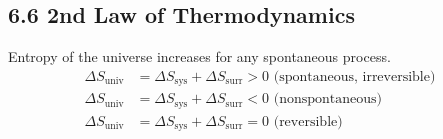 \subsection{6.6 2nd Law of Thermodynamics}
    \vspace*{0.2em}
    Entropy of the universe increases for any spontaneous process.
    \begin{align*}
        \Delta S_\text{univ} & = \Delta S_\text{sys} + \Delta S_\text{surr} > 0 \text{ (spontaneous, irreversible)}\\
        \Delta S_\text{univ} & = \Delta S_\text{sys} + \Delta S_\text{surr} < 0 \text{ (nonspontaneous)}\\
        \Delta S_\text{univ} & = \Delta S_\text{sys} + \Delta S_\text{surr} = 0 \text{ (reversible)}
    \end{align*}